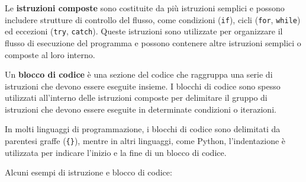 \documentclass[
  letterpaper,
]{scrbook}
\begin{document}
Le \textbf{istruzioni composte} sono costituite da più istruzioni
semplici e possono includere strutture di controllo del flusso, come
condizioni (\texttt{if}), cicli (\texttt{for}, \texttt{while}) ed
eccezioni (\texttt{try}, \texttt{catch}). Queste istruzioni sono
utilizzate per organizzare il flusso di esecuzione del programma e
possono contenere altre istruzioni semplici o composte al loro interno.

Un \textbf{blocco di codice} è una sezione del codice che raggruppa una
serie di istruzioni che devono essere eseguite insieme. I blocchi di
codice sono spesso utilizzati all'interno delle istruzioni composte per
delimitare il gruppo di istruzioni che devono essere eseguite in
determinate condizioni o iterazioni.

In molti linguaggi di programmazione, i blocchi di codice sono
delimitati da parentesi graffe (\texttt{\{\}}), mentre in altri
linguaggi, come Python, l'indentazione è utilizzata per indicare
l'inizio e la fine di un blocco di codice.

Alcuni esempi di istruzione e blocco di codice:
\end{document}
